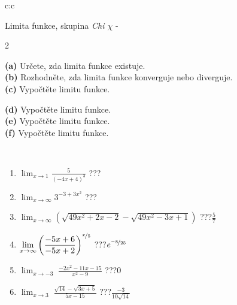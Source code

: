 \documentclass[10pt]{report}
\begin{document}
\begin{tabular}{c:c}
\begin{minipage}[c][104.5mm][t]{0.5\linewidth}
\begin{center}
\vspace{7mm}
{\huge Limita funkce, skupina \textit{Chi $\chi$} -}\\[5mm]
\begin{minipage}{0.95\linewidth}
\begin{center}
{\small \begin{multicols}{2} \raggedright
\textbf{(a)} Určete, zda limita funkce existuje. \\[1mm]
\textbf{(b)} Rozhodněte, zda limita funkce konverguje nebo diverguje. \\[1mm]
\textbf{(c)} Vypočtěte limitu funkce. \par \columnbreak
\textbf{(d)} Vypočtěte limitu funkce. \\[1mm]
\textbf{(e)} Vypočtěte limitu funkce. \\[1mm]
\textbf{(f)} Vypočtěte limitu funkce. \\[1mm]
\end{multicols}
}
\end{center}
\end{minipage}
\\[4mm]
\begin{minipage}{0.79\linewidth}
\begin{center}
\begin{varwidth}{\linewidth}
\begin{enumerate}
\normalsize
\item $\displaystyle\lim_{x\to1}{\frac{5}{(-4x+4)^{3}}}$\quad \dotfill\; ???\;\dotfill \quad {}
\item $\displaystyle\lim_{x\to\infty}{3^{-3+3x^2}}$\quad \dotfill\; ???\;\dotfill \quad {}
\item $\displaystyle\lim_{x\to\infty}{\left(\sqrt{49x^2+2x-2} - \sqrt{49x^2-3x+1}\right)}$\quad \dotfill\; ???\;\dotfill \quad $\frac{5}{7}$
\item $\displaystyle\lim_{x\to\infty}{\left( \frac{-5x+6}{-5x+2} \right)^{\nicefrac{x}{5}}}$\quad \dotfill\; ???\;\dotfill \quad $e^{\nicefrac{-8}{25}}$
\item $\displaystyle\lim_{x\to -3}{\;\frac{-2x^2-11x-15}{x^2-9}}$\quad \dotfill\; ???\;\dotfill \quad $0$
\item $\displaystyle\lim_{x\to 3}{\;\frac{\sqrt{14}-\sqrt{3x+5}}{5x-15}}$\quad \dotfill\; ???\;\dotfill \quad $\frac{-3}{10\sqrt{14}}$

\end{enumerate}
\end{varwidth}
\end{center}
\end{minipage}
\end{center}
\end{minipage}
\end{tabular}
\end{document}

